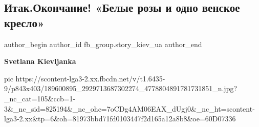  
 
 
 
 
 
\subsection{Итак.Окончание! «Белые розы и одно венское кресло»}
\label{sec:22_05_2021.fb.fb_group.story_kiev_ua.1.belye_rozy_okonchanie}
\ifcmt
 author_begin
   author_id fb_group.story_kiev_ua
 author_end
\fi

\textbf{Svetlana Kievljanka}


\ifcmt
  pic https://scontent-lga3-2.xx.fbcdn.net/v/t1.6435-9/p843x403/189600895_2929713687302274_4778804891781731851_n.jpg?_nc_cat=105&ccb=1-3&_nc_sid=825194&_nc_ohc=7oCDg4AM06EAX_dUgj0&_nc_ht=scontent-lga3-2.xx&tp=6&oh=81973bbd71fd0103447f2d165a12a8b8&oe=60D07336
\fi


